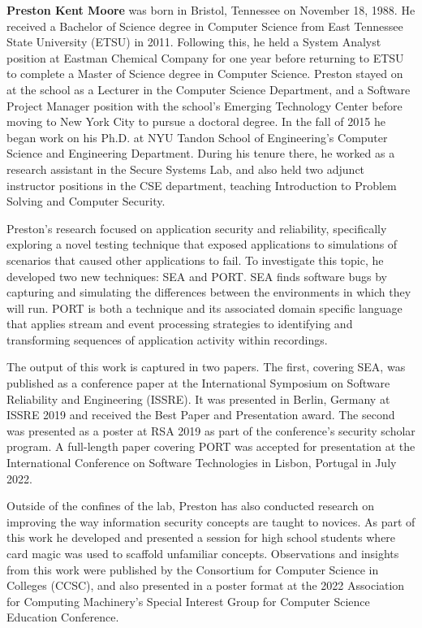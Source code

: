 

\textbf{Preston Kent Moore} was born in Bristol, Tennessee on November 18, 1988.  He received a Bachelor of Science degree in Computer Science from East Tennessee State University (ETSU) in 2011.
Following this, he held a System Analyst position at Eastman Chemical Company for one year
before returning to ETSU to complete a Master of Science degree in Computer Science.
Preston stayed on at the school as a Lecturer in the Computer Science Department, and a Software Project Manager position with the school's Emerging Technology Center before moving to New York City to pursue a doctoral degree.
In the fall of 2015 he began work on his Ph.D. at NYU Tandon School of Engineering's Computer Science and Engineering Department. During his tenure there, he worked as a research assistant in the Secure Systems Lab, and also held two adjunct instructor positions in the CSE department, teaching Introduction to Problem Solving and Computer Security.

Preston's research focused on application security and reliability, specifically
exploring a novel testing technique that exposed applications to simulations of scenarios that caused other applications to fail.
To investigate this topic, he developed two new techniques: SEA and PORT.
SEA finds software bugs by capturing and simulating the differences between the environments in which they will run.
PORT is both a technique and its associated domain specific language that applies stream and event processing strategies to identifying and transforming  sequences of application activity within recordings.

The output of  this work is captured in two papers. The first, covering SEA, was published as a conference paper at the International Symposium on Software Reliability and Engineering (ISSRE).
It was presented in Berlin, Germany at ISSRE 2019 and received the Best Paper and Presentation award.
The second was presented as a poster at RSA 2019 as part of the conference's security scholar program.
A full-length paper covering PORT was accepted for presentation at the International Conference on Software Technologies in Lisbon, Portugal in July 2022.

Outside of the confines of the lab, Preston has also conducted research on improving the way information security concepts are taught to novices.
As part of this work he developed and presented a session for high school students where card magic was used to scaffold unfamiliar concepts.
Observations and insights from this work were published by the Consortium for Computer Science in Colleges (CCSC), and also presented in a poster format at the 2022 Association for Computing Machinery's Special Interest Group for Computer Science Education Conference.


